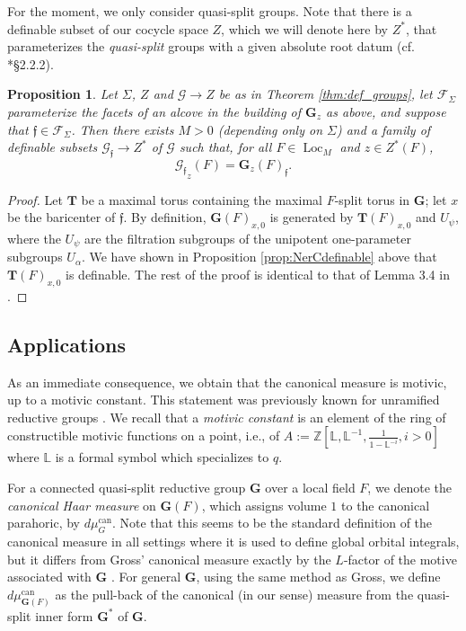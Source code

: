 \documentclass{amsart}
\newcommand{\Z}{{\mathbb Z}}
\newcommand{\cF}{\mathcal{F}}
\newcommand{\cG}{\mathcal{G}}
\DeclareMathOperator{\loc}{Loc}
\newcommand{\bG}{\mathbf{G}}
\newcommand{\bT}{\mathbf {T}}
\newcommand{\can}{\mathrm{can}}
\newcommand{\ff}{{\mathfrak f}}
\newcommand\lef{\mathbb L}
\theoremstyle{plain}
\newtheorem{prop}[thm]{Proposition}
\theoremstyle{definition}
\begin{document}
For the moment, we only consider quasi-split groups. 
Note that there is a definable subset of our cocycle space $Z$, which we will denote here by $Z^\ast$,
that parameterizes the \emph{quasi-split} groups with a given absolute root datum (cf. \cite{hales:transfert}*{\S 2.2.2}).  

\begin{prop}\label{prop:main}
 Let $\Sigma$, $Z$ and $\cG\to Z$ be as in Theorem \ref{thm:def_groups}, let 
 $\cF_{\Sigma}$ parameterize the facets of an alcove in the building of $\bG_z$ as above,
 and suppose that $\ff \in \cF_\Sigma$.  
Then there exists $M>0$ (depending only on $\Sigma$) and a family of definable subsets $\cG_{\ff} \to Z^\ast$ of $\cG$
 such that, for all $F\in \loc_M$ and $z\in Z^\ast(F)$, 
\[
{\cG_{\ff}}_{z}(F)= \bG_z(F)_{\ff}.
\]
\end{prop}

\begin{proof} Let $\bT$ be a maximal torus containing the maximal $F$-split torus in $\bG$; let $x$ be the baricenter of $\ff$.
By definition, $\bG(F)_{x,0}$ is generated by $\bT(F)_{x, 0}$ and $U_\psi$, where the $U_\psi$ are
the filtration subgroups of the unipotent one-parameter subgroups $U_{\alpha}$. 
We have shown in Proposition \ref{prop:NerCdefinable} above that  $\bT(F)_{x, 0}$ is definable.
The rest of the proof is identical to that of Lemma 3.4 in \cite{CGH-2}.  
\end{proof} 

\subsection{Applications} 
As an immediate consequence, we obtain that the canonical measure is motivic, up to a motivic constant.
This statement was previously known for unramified reductive groups \cite{cluckers-hales-loeser}.
We recall that a \emph{motivic constant} is an element of the ring of constructible motivic functions on a point,
i.e., of $A:=\Z[\lef, \lef^{-1}, \frac{1}{1-\lef^{-i}}, i>0]$ where $\lef$ is a formal symbol which specializes to $q$.

For a connected quasi-split reductive group $\bG$ over a local field $F$, we denote the \emph{canonical Haar measure}
on $\bG(F)$, which assigns volume $1$ to the canonical parahoric, by $d\mu_G^\can$. 
Note that this seems to be the standard definition of the canonical measure in all settings
where it is used to define global orbital integrals, but it differs from Gross' canonical measure
exactly by the $L$-factor of the motive associated with $\bG$ \cite{gross:motive}.  For general $\bG$, using the same method as Gross, 
we define $d\mu_{\bG(F)}^\can$ as the pull-back of the canonical (in our sense) measure from the quasi-split inner form $\bG^\ast$ of $\bG$.  
\end{document}
